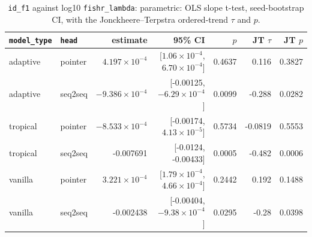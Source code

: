 \documentclass[10pt]{article}
\begin{document}
{\small
\begin{longtable}{llrrrrr}
\caption{\texttt{id\_f1} against log10 \texttt{fishr\_lambda}: parametric: OLS slope t-test, seed-bootstrap CI, with the Jonckheere--Terpstra ordered-trend $\tau$ and $p$.}\label{tab:trend-id_f1}\\
\toprule
\texttt{model\_type} & \texttt{head} & estimate & 95\% CI & $p$ & JT $\tau$ & JT $p$\\
\midrule
\endhead
adaptive & pointer & $4.197\times10^{-4}$ & [$1.06\times10^{-4}$, $6.70\times10^{-4}$] & 0.4637 & 0.116 & 0.3827\\
adaptive & seq2seq & $-9.386\times10^{-4}$ & [-0.00125, $-6.29\times10^{-4}$] & 0.0099 & -0.288 & 0.0282\\
tropical & pointer & $-8.533\times10^{-4}$ & [-0.00174, $4.13\times10^{-5}$] & 0.5734 & -0.0819 & 0.5553\\
tropical & seq2seq & -0.007691 & [-0.0124, -0.00433] & 0.0005 & -0.482 & 0.0006\\
vanilla & pointer & $3.221\times10^{-4}$ & [$1.79\times10^{-4}$, $4.66\times10^{-4}$] & 0.2442 & 0.192 & 0.1488\\
vanilla & seq2seq & -0.002438 & [-0.00404, $-9.38\times10^{-4}$] & 0.0295 & -0.28 & 0.0398\\
\bottomrule
\end{longtable}
}
\end{document}
